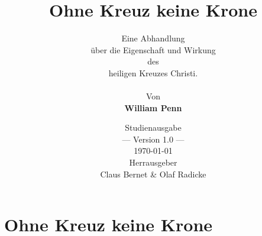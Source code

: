 \documentclass[a5paper,pagesize,9pt]{scrbook}
\begin{document}
\author{
Eine Abhandlung \\
über die Eigenschaft und Wirkung
\\
des
\\
heiligen Kreuzes Christi.
\\
\\
Von
\\
\textbf{William Penn}
}

\title{Ohne Kreuz keine Krone}
\date{
Studienausgabe
\\ --- Version 1.0 ---
\\ \today
\bigskip
\\ Herrausgeber
\\Claus Bernet \& Olaf Radicke
}

\maketitle

\frontmatter

\tableofcontents




\mainmatter
\part{Ohne Kreuz keine Krone}


\end{document}
